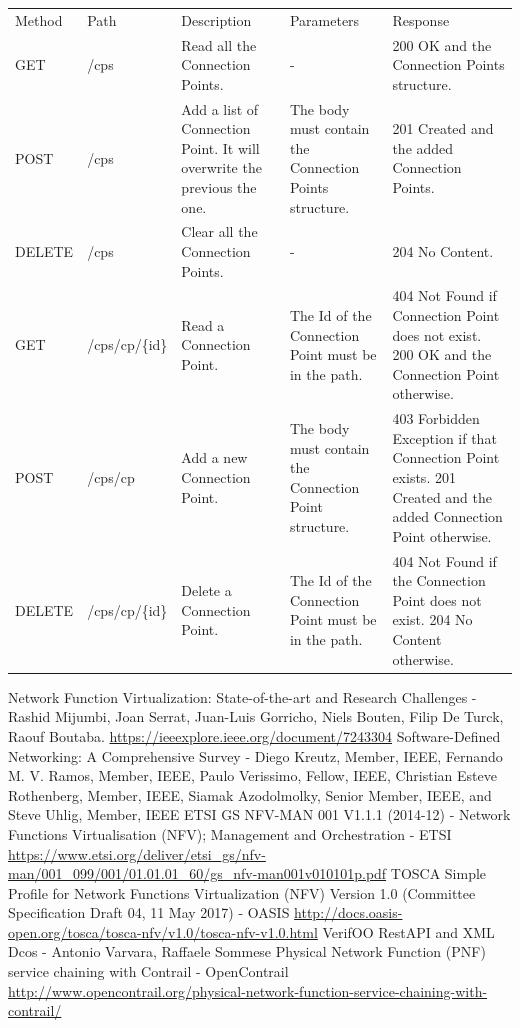 \documentclass[11pt, english]{article}
\begin{document}
\begin{tabular}{ |p{2cm}|m{3cm}|p{3cm}|p{3cm}|p{4cm}| }
    \hline
    \rowcolor{black} \multicolumn{5}{|c|}{\textcolor{white}{ConnectionPoints}} \\
    \hline
    \rowcolor{Gray}
    Method & Path & Description & Parameters & Response \\
    \hline
    GET   & /cps & Read all the Connection Points. & - & 200 OK and the Connection Points structure. \\
    \hline
    POST & /cps & Add a list of Connection Point. It will overwrite the previous the one. & The body must contain the Connection Points structure. & 201 Created and the added Connection Points. \\
    \hline
    DELETE & /cps & Clear all the Connection Points. & - & 204 No Content. \\
    \hline
    GET & /cps/cp/\{id\} & Read a Connection Point. & The Id of the Connection Point must be in the path. & 404 Not Found if Connection Point does not exist. 200 OK and the Connection Point otherwise. \\
    \hline
    POST & /cps/cp & Add a new Connection Point. & The body must contain the Connection Point structure. & 403 Forbidden Exception if that Connection Point exists. 201 Created and the added Connection Point otherwise. \\
    \hline
    DELETE & /cps/cp/\{id\} & Delete a Connection Point. & The Id of the Connection Point must be in the path. & 404 Not Found if the Connection Point does not exist. 204 No Content otherwise. \\
    \hline
\end{tabular}

\newpage
\begin{thebibliography}{5}
        Network Function Virtualization: State-of-the-art and Research Challenges - Rashid Mijumbi, Joan Serrat, Juan-Luis Gorricho, Niels Bouten, Filip De Turck, Raouf Boutaba.
        \url{https://ieeexplore.ieee.org/document/7243304}
        Software-Defined Networking: A Comprehensive Survey - Diego Kreutz, Member, IEEE, Fernando M. V. Ramos, Member, IEEE, Paulo Verissimo, Fellow, IEEE, Christian Esteve Rothenberg, Member, IEEE, Siamak Azodolmolky, Senior Member, IEEE, and Steve Uhlig, Member, IEEE
        ETSI GS NFV-MAN 001 V1.1.1 (2014-12) - Network Functions Virtualisation (NFV); Management and Orchestration - ETSI
        \url{https://www.etsi.org/deliver/etsi_gs/nfv-man/001_099/001/01.01.01_60/gs_nfv-man001v010101p.pdf}
        TOSCA Simple Profile for Network Functions Virtualization (NFV) Version 1.0 (Committee Specification Draft 04, 11 May 2017) - OASIS
        \url{http://docs.oasis-open.org/tosca/tosca-nfv/v1.0/tosca-nfv-v1.0.html}
        VerifOO RestAPI and XML Dcos - Antonio Varvara, Raffaele Sommese
        Physical Network Function (PNF) service chaining with Contrail - OpenContrail
        \url{http://www.opencontrail.org/physical-network-function-service-chaining-with-contrail/}
\end{thebibliography}
\end{document}
